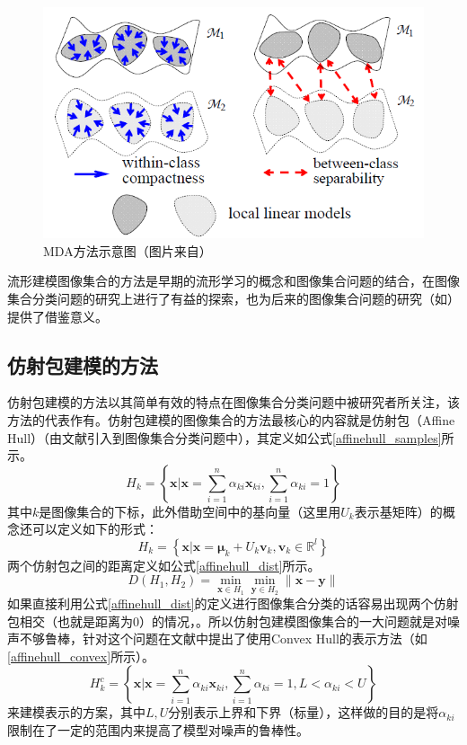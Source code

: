\begin{figure}[h]
	\centering
	\includegraphics[width=0.7\linewidth]{source/MDA.png}
	\caption[MDA方法示意图]{MDA方法示意图（图片来自\cite{Manifold_MDA}）}
	\label{fig:MDA}
\end{figure}
流形建模图像集合的方法是早期的流形学习的概念和图像集合问题的结合，在图像集合分类问题的研究上进行了有益的探索，也为后来的图像集合问题的研究（如\cite{Statistics_DARG,Statistics_BeyondGauss}）提供了借鉴意义。
\subsection{仿射包建模的方法}
\label{sec:current_Affinehull}
仿射包建模的方法以其简单有效的特点在图像集合分类问题中被研究者所关注，该方法的代表作有\cite{Affinehull_AF,Affinehull_SANP,Affinehull_RNP,Affinehull_ProNN}。仿射包建模的图像集合的方法最核心的内容就是仿射包（Affine Hull）（由文献\cite{Affinehull_AF}引入到图像集合分类问题中），其定义如公式\ref{affinehull_samples}所示。
\begin{equation}
\label{affinehull_samples}
H_k=\left\{\bm{x}|\bm{x}=\sum_{i=1}^n \alpha_{ki} \bm{x}_{ki},\sum_{i=1}^n \alpha_{ki} =1 \right\}
\end{equation}
其中$k$是图像集合的下标，此外借助空间中的基向量（这里用$U_k$表示基矩阵）的概念还可以定义如下的形式：
\begin{equation}
\label{affinehull_bases}
H_k=\left\{\bm{x}|\bm{x}=\bm{\mu}_k+U_k \bm{v}_k,\bm{v}_k \in \mathbb{R}^l\right\} 
\end{equation}
两个仿射包之间的距离定义如公式\ref{affinehull_dist}所示。
\begin{equation}
\label{affinehull_dist}
D(H_1,H_2)=\min_{\bm{x}\in H_1}\min_{\bm{y}\in H_2}\|\bm{x}-\bm{y}\| 
\end{equation}
如果直接利用公式\ref{affinehull_dist}的定义进行图像集合分类的话容易出现两个仿射包相交（也就是距离为0）的情况，。所以仿射包建模图像集合的一大问题就是对噪声不够鲁棒，针对这个问题\cite{Affinehull_AF}在文献中提出了使用Convex Hull的表示方法（如\ref{affinehull_convex}所示）。
\begin{equation}
\label{affinehull_convex}
H_k^c=\left\{\bm{x}|\bm{x}=\sum_{i=1}^n \alpha_{ki} \bm{x}_{ki},\sum_{i=1}^n \alpha_{ki}=1,L< \alpha_{ki}<U\right\} 
\end{equation}
来建模表示的方案，其中$L,U$分别表示上界和下界（标量），这样做的目的是将$\alpha_{ki}$限制在了一定的范围内来提高了模型对噪声的鲁棒性。


